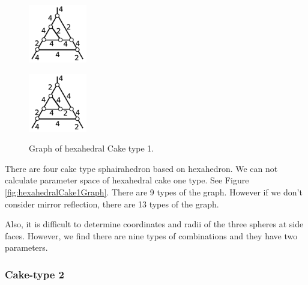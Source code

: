 \documentclass[suppldata, dvipdfmx]{interact}
\theoremstyle{plain}%
\theoremstyle{definition}
\theoremstyle{remark}
\theoremstyle{problemstyle}
\begin{document}
\begin{figure}[h!tbp]
\begin{minipage}[t]{0.23\textwidth}
   \subcaption{}
   \label{fig:cake1j}
  \end{minipage}
 \hspace*{\fill}
  \begin{minipage}[t]{0.23\textwidth}
   \centering
   \includegraphics[width=1in, keepaspectratio]{./img/HexahedraWithSphericalFaces/hexahedralCake1/k.jpg}
   \subcaption{}
   \label{fig:cake1k}
  \end{minipage}
 \hspace*{\fill}
  \begin{minipage}[t]{0.23\textwidth}
   \centering
   \includegraphics[width=1in, keepaspectratio]{./img/HexahedraWithSphericalFaces/hexahedralCake1/m.jpg}
   \subcaption{}
   \label{fig:cake1m}
  \end{minipage}
  \hspace*{\fill}
  \caption{Graph of hexahedral Cake type 1.}
  \label{fig:hexahedralCake1List}
\end{figure}

There are four cake type sphairahedron based on hexahedron.
We can not calculate parameter space of hexahedral cake one type.
See Figure \ref{fig:hexahedralCake1Graph}.
There are 9 types of the graph. 
However if we don't consider mirror reflection, there are 13 types of
the graph.

Also, it is difficult to determine coordinates and radii of the three spheres
at side faces.
However, we find there are nine types of combinations
and they have two parameters.

\subsubsection{Cake-type 2}
\end{document}
